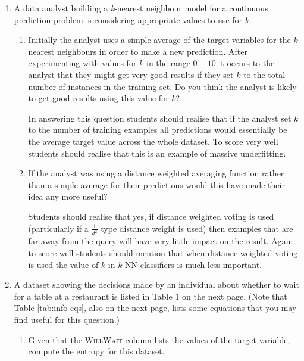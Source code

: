 \documentclass[--SOLUTION-OPTION--]{ditpaper}
\begin{document}
\clearpage

\newpage

\question 
	\begin{enumerate}
		\item A data analyst building a \emph{k}-nearest neighbour model for a continuous prediction problem is considering appropriate values to use for $k$. 
	\begin{enumerate}
		\item Initially the analyst uses a simple average of the target variables for the $k$ nearest neighbours in order to make a new prediction. After experimenting with values for $k$ in the range $0 - 10$ it occurs to the analyst that they might get very good results if they set $k$ to the total number of instances in the training set. Do you think the analyst is likely to get good results using this value for $k$?
\begin{answer}
In answering this question students should realise that if the analyst set $k$ to the number of training examples all predictions would essentially be the average target value across the whole dataset. To score very well students should realise that this is an example of massive underfitting.
\end{answer}
		\item If the analyst was using a distance weighted averaging function rather than a simple average for their predictions would this have made their idea any more useful?
\begin{answer}
Students should realise that yes, if distance weighted voting is used (particularly if a $\frac{1}{d^2}$ type distance weight is used) then examples that are far away from the query will have very little impact on the result. Again to score well students should mention that when distance weighted voting is used the value of $k$ in $k$-NN classifiers is much less important.
\end{answer}
	\end{enumerate}
		\item A dataset showing the decisions made by an individual about whether to wait for a table at a restaurant is listed in Table 1 on the next page. (Note that Table \ref{tab:info-eqs}, also on the next page, lists some equations that you may find useful for this question.)		
	\begin{enumerate}
		\item Given that the \textsc{WillWait} column lists the values of the target variable, compute the entropy for this dataset.

\end{enumerate}
\end{enumerate}
\end{document}
